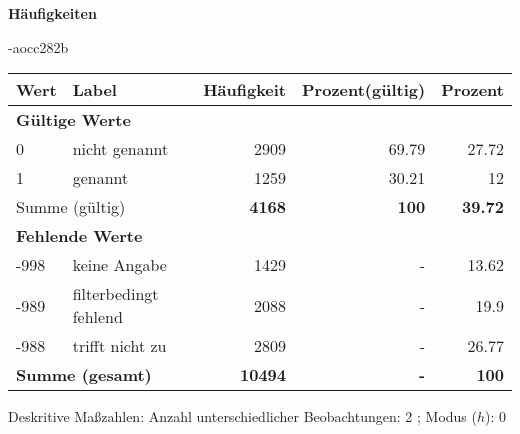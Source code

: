         		\vspace*{0.5cm}
                \noindent\textbf{Häufigkeiten}

                \vspace*{-\baselineskip}
					\begin{filecontents}{\jobname-aocc282b}
					\begin{longtable}{lXrrr}
					\toprule
					\textbf{Wert} & \textbf{Label} & \textbf{Häufigkeit} & \textbf{Prozent(gültig)} & \textbf{Prozent} \\
					\endhead
					\midrule
					\multicolumn{5}{l}{\textbf{Gültige Werte}}\\

					0 &
					\multicolumn{1}{X}{ nicht genannt   } &


					  \num{2909} &
					  \num[round-mode=places,round-precision=2]{69,79} &
					    \num[round-mode=places,round-precision=2]{27,72} \\

					1 &
					\multicolumn{1}{X}{ genannt   } &


					  \num{1259} &
					  \num[round-mode=places,round-precision=2]{30,21} &
					    \num[round-mode=places,round-precision=2]{12} \\
					\midrule
					\multicolumn{2}{l}{Summe (gültig)} &
					  \textbf{\num{4168}} &
					\textbf{100} &
					  \textbf{\num[round-mode=places,round-precision=2]{39,72}} \\
					\multicolumn{5}{l}{\textbf{Fehlende Werte}}\\
							-998 &
							keine Angabe &
							  \num{1429} &
							 - &
							  \num[round-mode=places,round-precision=2]{13,62} \\
							-989 &
							filterbedingt fehlend &
							  \num{2088} &
							 - &
							  \num[round-mode=places,round-precision=2]{19,9} \\
							-988 &
							trifft nicht zu &
							  \num{2809} &
							 - &
							  \num[round-mode=places,round-precision=2]{26,77} \\
					\midrule
					\multicolumn{2}{l}{\textbf{Summe (gesamt)}} &
				      \textbf{\num{10494}} &
				    \textbf{-} &
				    \textbf{100} \\
					\bottomrule
					\end{longtable}
					\end{filecontents}
				\label{tableValues:aocc282b}
				\vspace*{-\baselineskip}
                    \begin{noten}
                	    \note{} Deskritive Maßzahlen:
                	    Anzahl unterschiedlicher Beobachtungen: 2%
                	    ; 
                	      Modus ($h$): 0
                     \end{noten}


